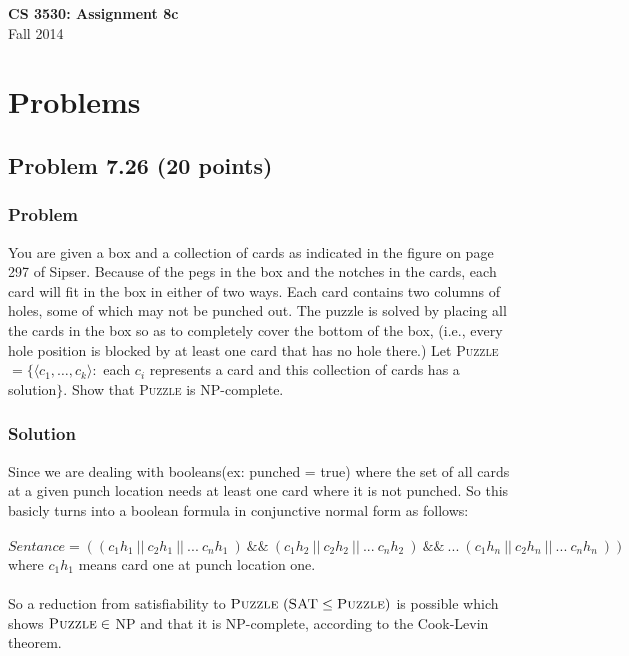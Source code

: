 \documentclass{article}
\begin{document}
\begin{empfile}

\begin{center}
\textbf{\Large CS 3530: Assignment 8c} \\[2mm]
Fall 2014
\end{center}

\raggedright

\section*{Problems}

\subsection*{Problem 7.26 (20 points)}

\subsubsection*{Problem}

You are given a box and a collection of cards as indicated in the
figure on page 297 of Sipser. Because of the pegs in the box and the
notches in the cards, each card will fit in the box in either of two
ways. Each card contains two columns of holes, some of which may not
be punched out. The puzzle is solved by placing all the cards in the
box so as to completely cover the bottom of the box, (i.e., every
hole position is blocked by at least one card that has no hole
there.) Let \textsc{Puzzle} $=\{\langle c_1,\ldots,c_k\rangle:$ each
$c_i$ represents a card and this collection of cards has a
solution$\}$. Show that \textsc{Puzzle} is NP-complete.

\subsubsection*{Solution}

Since we are dealing with booleans(ex: punched = true) 
where the set of all cards at a given punch location needs
at least one card where it is not punched. So this basicly 
turns into a boolean formula in conjunctive normal form as 
follows:\\ \ \\

$Sentance = ((c_1h_1\ ||\ c_2h_1\ ||\ ...\ c_nh_1\ )\ \&\&\ 
(c_1h_2\ ||\ c_2h_2\ ||\ ...\ c_nh_2\ )\ \&\&\ ...\ 
(c_1h_n\ ||\ c_2h_n\ ||\ ...\ c_nh_n\ ))$ \\
where $c_1h_1$ means card one at punch location one. \\ \ \\

So a reduction from satisfiability to $\textsc{Puzzle}\  
(\textsc{SAT} \le \textsc{Puzzle})$ is possible which shows
$\textsc{Puzzle} \in$ NP and that it is NP-complete,
according to the Cook-Levin theorem.


\end{empfile}
\immediate{}
\end{document}
